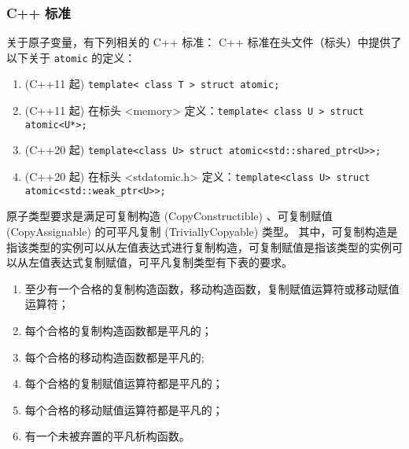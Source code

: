 \subsubsection{C++ 标准}
关于原子变量，有下列相关的 C++ 标准：
C++ 标准在头文件（标头）中提供了以下关于 \verb`atomic` 的定义：
\begin{enumerate}
\item (C++11 起) \verb`template< class T > struct atomic;`
\item (C++11 起) 在标头 <memory> 定义：\verb`template< class U > struct atomic<U*>;`
\item (C++20 起) \verb`template<class U> struct atomic<std::shared_ptr<U>>;`
\item (C++20 起) 在标头 <stdatomic.h> 定义：\verb`template<class U> struct atomic<std::weak_ptr<U>>;`
\end{enumerate}

原子类型要求是满足可复制构造 (CopyConstructible) 、可复制赋值 (CopyAssignable) 的可平凡复制 (TriviallyCopyable) 类型。
其中，可复制构造是指该类型的实例可以从左值表达式进行复制构造，可复制赋值是指该类型的实例可以从左值表达式复制赋值，可平凡复制类型有下表的要求。
\begin{enumerate}
\item 至少有一个合格的复制构造函数，移动构造函数，复制赋值运算符或移动赋值运算符；
\item 每个合格的复制构造函数都是平凡的；
\item 每个合格的移动构造函数都是平凡的;
\item 每个合格的复制赋值运算符都是平凡的；
\item 每个合格的移动赋值运算符都是平凡的；
\item 有一个未被弃置的平凡析构函数。
\end{enumerate}